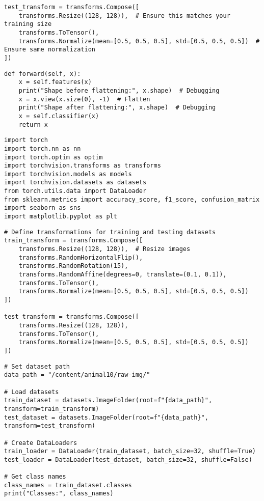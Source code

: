 \documentclass{article}
\begin{document}
\begin{verbatim}
test_transform = transforms.Compose([
    transforms.Resize((128, 128)),  # Ensure this matches your training size
    transforms.ToTensor(),
    transforms.Normalize(mean=[0.5, 0.5, 0.5], std=[0.5, 0.5, 0.5])  # Ensure same normalization
])

\end{verbatim}

\begin{verbatim}
def forward(self, x):
    x = self.features(x)
    print("Shape before flattening:", x.shape)  # Debugging
    x = x.view(x.size(0), -1)  # Flatten
    print("Shape after flattening:", x.shape)  # Debugging
    x = self.classifier(x)
    return x

\end{verbatim}

\begin{verbatim}
import torch
import torch.nn as nn
import torch.optim as optim
import torchvision.transforms as transforms
import torchvision.models as models
import torchvision.datasets as datasets
from torch.utils.data import DataLoader
from sklearn.metrics import accuracy_score, f1_score, confusion_matrix
import seaborn as sns
import matplotlib.pyplot as plt

\end{verbatim}

\begin{verbatim}
# Define transformations for training and testing datasets
train_transform = transforms.Compose([
    transforms.Resize((128, 128)),  # Resize images
    transforms.RandomHorizontalFlip(),
    transforms.RandomRotation(15),
    transforms.RandomAffine(degrees=0, translate=(0.1, 0.1)),
    transforms.ToTensor(),
    transforms.Normalize(mean=[0.5, 0.5, 0.5], std=[0.5, 0.5, 0.5])
])

test_transform = transforms.Compose([
    transforms.Resize((128, 128)),
    transforms.ToTensor(),
    transforms.Normalize(mean=[0.5, 0.5, 0.5], std=[0.5, 0.5, 0.5])
])

\end{verbatim}

\begin{verbatim}
# Set dataset path
data_path = "/content/animal10/raw-img/"

# Load datasets
train_dataset = datasets.ImageFolder(root=f"{data_path}", transform=train_transform)
test_dataset = datasets.ImageFolder(root=f"{data_path}", transform=test_transform)

# Create DataLoaders
train_loader = DataLoader(train_dataset, batch_size=32, shuffle=True)
test_loader = DataLoader(test_dataset, batch_size=32, shuffle=False)

# Get class names
class_names = train_dataset.classes
print("Classes:", class_names)

\end{verbatim}
\end{document}
